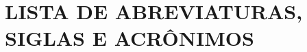 

\incluirlistadeilustracoes%


\incluirlistadetabelas%


\chapter*{LISTA DE ABREVIATURAS, SIGLAS E ACRÔNIMOS}

